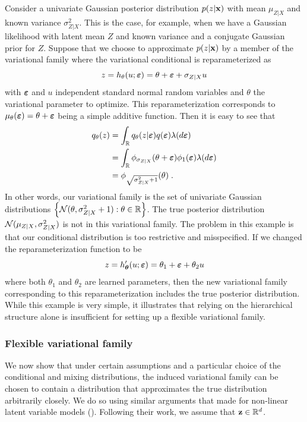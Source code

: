 \documentclass[10pt]{article}
\begin{document}
Consider a univariate Gaussian posterior distribution $p(z|\mathbf{x})$ with mean $\mu_{Z|X}$ and known variance $\sigma_{Z|X}^2$. This is the case, for example, when we have a Gaussian likelihood with latent mean $Z$ and known variance and a conjugate Gaussian prior for $Z$. Suppose that we choose to approximate $p(z|\mathbf{x})$ by a member of the \uivi variational family where the variational conditional is reparameterized as
\[
z = h_\theta(u;\bm{\varepsilon}) = \theta + \bm{\varepsilon} + \sigma_{Z|X}u
\]
with $\bm{\varepsilon}$ and $u$ independent standard normal random variables and $\theta$ the variational parameter to optimize. This reparameterization corresponds to $\mu_\theta(\bm{\varepsilon})=\theta+\bm{\varepsilon}$ being a simple additive function. Then it is easy to see that
\begin{align*}
q_\theta(z) &= \int_{\mathbb{R}} q_\theta(z|\bm{\varepsilon})q(\bm{\varepsilon})\lambda(d\bm{\varepsilon}) \\
&= \int_{\mathbb{R}} \phi_{\sigma_{Z|X}}(\theta+\bm{\varepsilon})\phi_1(\bm{\varepsilon}) \lambda(d\bm{\varepsilon}) \\
&= \phi_{\sqrt{\sigma_{Z|X}^2+1}}(\theta) \;.
\end{align*}
In other words, our variational family is the set of univariate Gaussian distributions $\left\{\mathcal{N}(\theta,\sigma_{Z|X}^2+1):\theta\in\mathbb{R}\right\}$. The true posterior distribution $\mathcal{N}(\mu_{Z|X},\sigma_{Z|X}^2)$ is not in this variational family. The problem in this example is that our conditional distribution is too restrictive and misspecified. If we changed the reparameterization function to be
\[
z = h_{\bm{\theta}}'(u;\bm{\varepsilon}) = \theta_1 + \bm{\varepsilon} + \theta_2u
\]
where both $\theta_1$ and $\theta_2$ are learned parameters, then the new variational family corresponding to this reparameterization includes the true posterior distribution. While this example is very simple, it illustrates that relying on the hierarchical structure alone is insufficient for setting up a flexible variational family.


\subsubsection{Flexible variational family}

We now show that under certain assumptions and a particular choice of the conditional and mixing distributions, the induced \uivi variational family can be chosen to contain a distribution that approximates the true distribution arbitrarily closely. We do so using similar arguments that \citet{Plummer:2021} made for non-linear latent variable models (\nllvm). Following their work, we assume that $\mathbf{z}\in\mathbb{R}^d$.
\\
\end{document}
